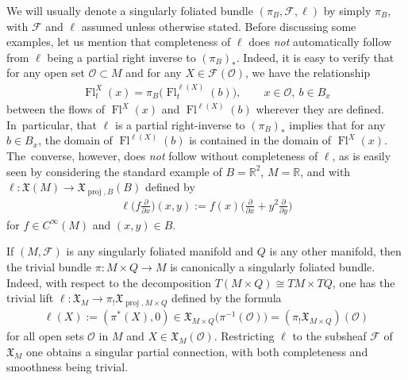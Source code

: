 \documentclass[11pt]{article}
\numberwithin{equation}{section}
\numberwithin{equation}{section}
\def\proj{\operatorname{proj}}
\def\Fl{\operatorname{Fl}}
\def\FF{{\mathcal{F}}}
\def\OO{{\mathcal{O}}}
\def\RB{{\mathbb{R}}}
\def\XF{{\mathfrak{X}}}
\begin{document}
We will usually denote a singularly foliated bundle $(\pi_{B},\FF,\ell)$ by simply $\pi_{B}$, with $\FF$ and $\ell$ assumed unless otherwise stated. Before discussing some examples, let us mention that completeness of $\ell$ does \textit{not} automatically follow from $\ell$ being a partial right inverse to $(\pi_{B})_{*}$. Indeed, it is easy to verify that for any open set $\OO\subset M$ and for any $X\in\FF(\OO)$, we have the relationship
\begin{gather*}
\Fl^{X}_{t}(x) = \pi_{B}\big(\Fl^{\ell(X)}_{t}(b)\big),\qquad x\in\OO,\ b\in B_{x}
\end{gather*}
between the flows of $\Fl^{X}(x)$ and $\Fl^{\ell(X)}(b)$ wherever they are defined. In~particular, that $\ell$ is a partial right-inverse to $(\pi_{B})_{*}$ implies that for any $b\in B_{x}$, the domain of $\Fl^{\ell(X)}(b)$ is contained in the domain of $\Fl^{X}(x)$. The~converse, however, does \textit{not} follow without completeness of $\ell$, as is easily seen by considering the standard example of $B =\RB^{2}$, $M = \RB$, and with $\ell\colon \XF(M)\rightarrow\XF_{\proj,B}(B)$ defined by
\begin{gather*}
\ell\bigg(f\frac{\partial}{\partial x}\bigg)(x,y):=f(x)\bigg(\frac{\partial}{\partial x}+y^{2}\frac{\partial}{\partial y}\bigg)
\end{gather*}
for $f\in C^{\infty}(M)$ and $(x,y)\in B$.

\begin{Example}\label{triv}
If $(M,\FF)$ is any singularly foliated manifold and $Q$ is any other manifold, then the trivial bundle $\pi\colon M\times Q\rightarrow M$ is canonically a singularly foliated bundle. Indeed, with respect to the decomposition $T(M\times Q)\cong TM\times TQ$, one has the trivial lift $\ell\colon \XF_{M}\rightarrow\pi_{!}\XF_{\proj,M\times Q}$ defined by the formula
\begin{gather*}
\ell(X):=(\pi^{*}(X),0)\in\XF_{M\times Q}\big(\pi^{-1}(\OO)\big) = (\pi_{!}\XF_{M\times Q})(\OO)
\end{gather*}
for all open sets $\OO$ in $M$ and $X\in\XF_{M}(\OO)$. Restricting $\ell$ to the subsheaf $\FF$ of $\XF_{M}$ one obtains a singular partial connection, with both completeness and smoothness being trivial.
\end{Example}
\end{document}

